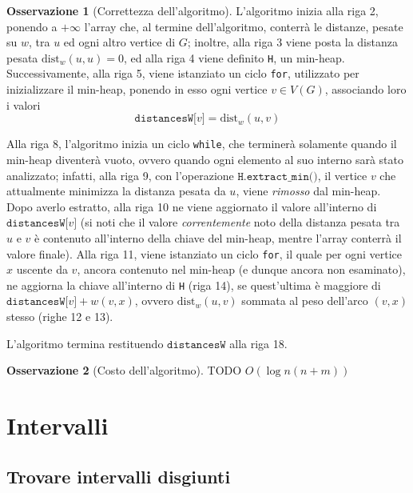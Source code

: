 \documentclass[14pt]{extreport}
\theoremstyle{definition}
\theoremstyle{definition}
\newtheorem{remark}{Osservazione}[subsection]
\begin{document}
\begin{remark}[Correttezza dell'algoritmo]
    L'algoritmo inizia alla riga 2, ponendo a $+ \infty$ l'array che, al termine dell'algoritmo, conterrà le distanze, pesate su $w$, tra $u$ ed ogni altro vertice di $G$; inoltre, alla riga 3 viene posta la distanza pesata $\mathrm{dist}_w(u, u) = 0$, ed alla riga 4 viene definito \texttt{H}, un min-heap. Successivamente, alla riga 5, viene istanziato un ciclo \texttt{for}, utilizzato per inizializzare il min-heap, ponendo in esso ogni vertice $v \in V(G)$, associando loro i valori $$\texttt{distancesW[}v\texttt{]} = \mathrm{dist}_w(u, v)$$

    Alla riga 8, l'algoritmo inizia un ciclo \texttt{while}, che terminerà solamente quando il min-heap diventerà vuoto, ovvero quando ogni elemento al suo interno sarà stato analizzato; infatti, alla riga 9, con l'operazione $\texttt{H.extract\_min()}$, il vertice $v$ che attualmente minimizza la distanza pesata da $u$, viene \textit{rimosso} dal min-heap. Dopo averlo estratto, alla riga 10 ne viene aggiornato il valore all'interno di $\texttt{distancesW[}v\texttt{]}$ (si noti che il valore \textit{correntemente} noto della distanza pesata tra $u$ e $v$ è contenuto all'interno della chiave del min-heap, mentre l'array conterrà il valore finale). Alla riga 11, viene istanziato un ciclo \texttt{for}, il quale per ogni vertice $x$ uscente da $v$, ancora contenuto nel min-heap (e dunque ancora non esaminato), ne aggiorna la chiave all'interno di \texttt{H} (riga 14), se quest'ultima è maggiore di $\texttt{distancesW[}v \texttt{]} + w(v, x)$, ovvero $\mathrm{dist}_w(u, v)$ sommata al peso dell'arco $(v, x)$ stesso (righe 12 e 13).

    L'algoritmo termina restituendo $\texttt{distancesW}$ alla riga 18.
\end{remark}

\begin{remark}[Costo dell'algoritmo]
    TODO $O(\log n(n + m))$
\end{remark}

\section{Intervalli}

\subsection{Trovare intervalli disgiunti}
\end{document}

